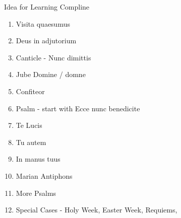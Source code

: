 
Idea for Learning Compline

\begin{enumerate}
\item Visita quaesumus

\item Deus in adjutorium

\item Canticle - Nunc dimittis

\item Jube Domine / domne

\item Confiteor

\item Psalm - start with Ecce nunc benedicite

\item Te Lucis

\item Tu autem

\item In manus tuus

\item Marian Antiphons

\item More Psalms

\item Special Cases - Holy Week, Easter Week, Requiems,

\end{enumerate}

